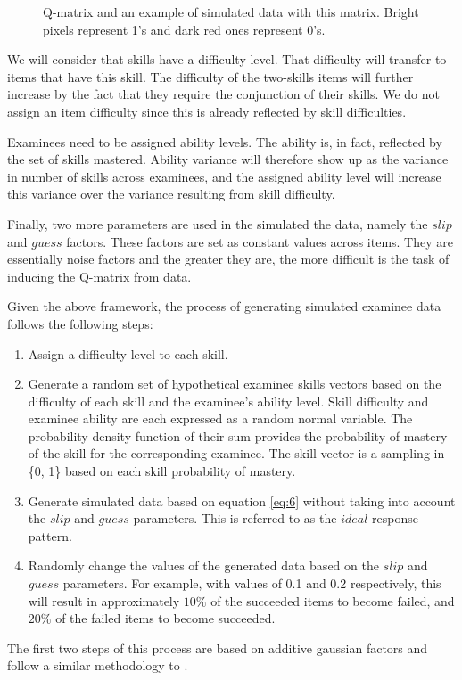 \begin{figure}[ht]
\centering

\quad
\caption{Q-matrix and an example of simulated data with this matrix.  Bright pixels represent 1's and dark red ones represent 0's.}
\label{figqmatrixandResutM}
\end{figure}


We will consider that skills have a difficulty level. That difficulty will transfer to items that have this skill. The difficulty of the two-skills items will further increase by the fact that they require the conjunction of their skills. We do not assign an item difficulty since this is already reflected by skill difficulties.

Examinees need to be assigned ability levels. The ability is, in fact, reflected by the set of skills mastered. Ability variance will therefore show up as the variance in number of skills across examinees, and the assigned ability level will increase this variance over the variance resulting from skill difficulty.

Finally, two more parameters are used in the simulated the data, namely the $\mathit{slip}$ and $\mathit{guess}$ factors. These factors are set as constant values across items. They are essentially noise factors and the greater they are, the more difficult is the task of inducing the Q-matrix from data.

Given the above framework, the process of generating simulated examinee data follows the following steps:
\begin{enumerate}
\item Assign a difficulty level to each skill.
\item Generate a random set of hypothetical examinee skills vectors based on the difficulty of each skill and the examinee\textquoteright{}s ability level. Skill difficulty and examinee ability are each expressed as a random normal variable. The probability density function of their sum provides the probability of mastery of the skill for the corresponding examinee. The skill vector is a sampling in \{0, 1\} based on each skill probability of mastery. 
\item Generate simulated data based on equation \ref{eq:6} without taking into account the $\mathit{slip}$ and $\mathit{guess}$ parameters. This is referred to as the $ideal$ response pattern.
\item Randomly change the values of the generated data based on the $\mathit{slip}$ and $\mathit{guess}$ parameters. For example, with values of 0.1 and 0.2 respectively, this will result in approximately $10\%$ of the succeeded items to become failed, and $20\%$ of the failed items to become succeeded.
\end{enumerate}
The first two steps of this process are based on additive gaussian factors and follow a similar methodology to \citep{desmarais2011conditions}.

